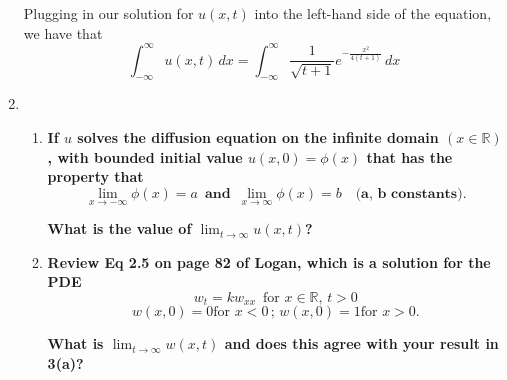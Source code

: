 \documentclass[11pt]{article}
\begin{document}
\begin{enumerate}
Plugging in our solution for $u(x, t)$ into the left-hand side of the equation, we have that
\[ \int_{-\infty}^{\infty} u(x, t) \, dx = \int_{-\infty}^{\infty}  \frac{1}{\sqrt{t+1}} e^{-\frac{x^2}{4(t+1)}} \, dx \]


\item \begin{enumerate}
	
\item \textbf{If $u$ solves the diffusion equation on the infinite domain $(x \in \mathbb{R})$, with bounded initial value $u(x, 0) = \phi(x)$ that has the property that}
\[ \lim_{x \rightarrow -\infty} \phi(x) = a \, \, \, \textbf{and} \, \, \, \lim_{x \rightarrow \infty} \phi(x) = b \, \, \, \, \, \,\textbf{(a, b constants)}.\]

\textbf{What is the value of $\lim_{t\rightarrow \infty} u(x, t)$?}

\item \textbf{Review Eq 2.5 on page 82 of Logan, which is a solution for the PDE}
\[ w_t = kw_{xx} \, \, \, \text{for } x \in \mathbb{R}, \, t > 0\]
\[ w(x, 0) = 0 \text{for } x < 0 \, ; \, w(x, 0) = 1 \text{for } x > 0.\]

\textbf{What is $\lim_{t \rightarrow \infty} w(x, t)$ and does this agree with your result in 3(a)?}
\end{enumerate}
\end{enumerate}
\end{document}
